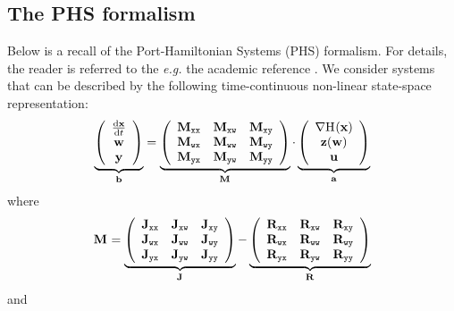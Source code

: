 \documentclass[10pt,a4paper]{article}
\begin{document}
\subsection{The PHS formalism}
%
Below is a recall of the Port-Hamiltonian Systems (PHS) formalism.
%
For details, the reader is referred to the \textit{e.g.} the academic reference \cite{falaize2016apassive}.
%
%
We consider systems that can be described by the following time-continuous non-linear state-space representation:
%
%
\begin{equation}
\label{eq:PHS}
\underbrace{\left(
\begin{array}{c}
\D{\vx}{t}\\
\vw\\
\vy
\end{array}
\right)}_{\vec b}
=
\underbrace{\left(\begin{array}{lll}
\M{xx}&\M{xw} & \M{xy}\\ 
\M{wx}&\M{ww} & \M{wy}\\ 
\M{yx}&\M{yw} & \M{yy}
\end{array}\right)}_{\M{}}
\cdot
\underbrace{\left(
\begin{array}{c}
\dxH{}(\vx)\\
\vz(\vw)\\
\vu
\end{array}
\right)
}_{\vec a}
\end{equation}
%
where 
\begin{equation}
\mathbf{M}_{\mathtt{}}
=
\underbrace{\left(\begin{array}{lll}
\mathbf{J}_{\mathtt{xx}}&\mathbf{J}_{\mathtt{xw}} & \mathbf{J}_{\mathtt{xy}}\\ 
\mathbf{J}_{\mathtt{wx}}&\mathbf{J}_{\mathtt{ww}} & \mathbf{J}_{\mathtt{wy}}\\ 
\mathbf{J}_{\mathtt{yx}}&\mathbf{J}_{\mathtt{yw}} & \mathbf{J}_{\mathtt{yy}}
\end{array}\right)}_{\mathbf{J}_{\mathtt{}}}
-
\underbrace{\left(\begin{array}{lll}
\mathbf{R}_{\mathtt{xx}}&\mathbf{R}_{\mathtt{xw}} & \mathbf{R}_{\mathtt{xy}}\\ 
\mathbf{R}_{\mathtt{wx}}&\mathbf{R}_{\mathtt{ww}} & \mathbf{R}_{\mathtt{wy}}\\ 
\mathbf{R}_{\mathtt{yx}}&\mathbf{R}_{\mathtt{yw}} & \mathbf{R}_{\mathtt{yy}}
\end{array}\right)}_{\mathbf{R}_{\mathtt{}}}
\end{equation}
%
and
%
\end{document}
